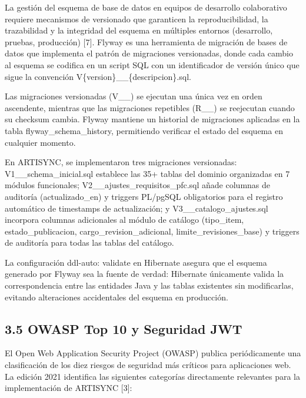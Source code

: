 \documentclass[
]{article}
\begin{document}
La gestión del esquema de base de datos en equipos de desarrollo
colaborativo requiere mecanismos de versionado que garanticen la
reproducibilidad, la trazabilidad y la integridad del esquema en
múltiples entornos (desarrollo, pruebas, producción) {[}7{]}. Flyway es
una herramienta de migración de bases de datos que implementa el patrón
de migraciones versionadas, donde cada cambio al esquema se codifica en
un script SQL con un identificador de versión único que sigue la
convención V\{version\}\_\_\{descripcion\}.sql.

Las migraciones versionadas (V\_\_) se ejecutan una única vez en orden
ascendente, mientras que las migraciones repetibles (R\_\_) se
reejecutan cuando su checksum cambia. Flyway mantiene un historial de
migraciones aplicadas en la tabla flyway\_schema\_history, permitiendo
verificar el estado del esquema en cualquier momento.

En ARTISYNC, se implementaron tres migraciones versionadas:
V1\_\_schema\_inicial.sql establece las 35+ tablas del dominio
organizadas en 7 módulos funcionales; V2\_\_ajustes\_requisitos\_pfc.sql
añade columnas de auditoría (actualizado\_en) y triggers PL/pgSQL
obligatorios para el registro automático de timestamps de actualización;
y V3\_\_catalogo\_ajustes.sql incorpora columnas adicionales al módulo
de catálogo (tipo\_item, estado\_publicacion,
cargo\_revision\_adicional, limite\_revisiones\_base) y triggers de
auditoría para todas las tablas del catálogo.

La configuración ddl-auto: validate en Hibernate asegura que el esquema
generado por Flyway sea la fuente de verdad: Hibernate únicamente valida
la correspondencia entre las entidades Java y las tablas existentes sin
modificarlas, evitando alteraciones accidentales del esquema en
producción.

\subsection{3.5 OWASP Top 10 y Seguridad
JWT}

El Open Web Application Security Project (OWASP) publica periódicamente
una clasificación de los diez riesgos de seguridad más críticos para
aplicaciones web. La edición 2021 identifica las siguientes categorías
directamente relevantes para la implementación de ARTISYNC {[}3{]}:
\end{document}
